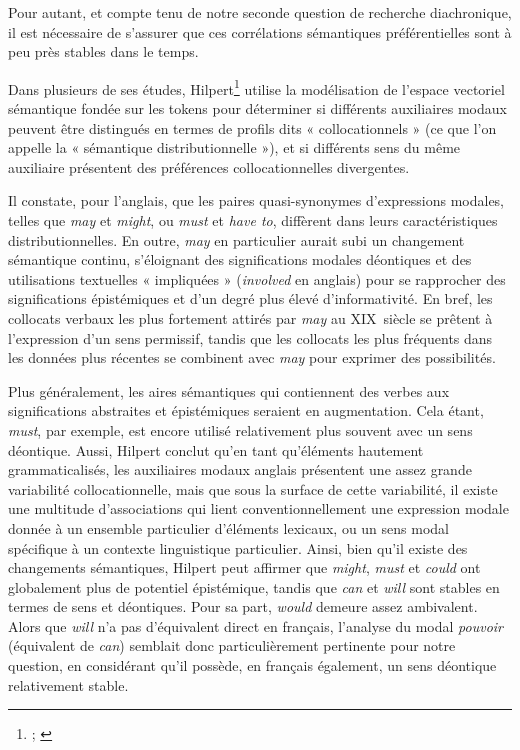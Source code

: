 Pour autant, et compte tenu de notre seconde question de recherche diachronique, il est nécessaire de s'assurer que ces corrélations sémantiques préférentielles sont à peu près stables dans le temps.

Dans plusieurs de ses études, Hilpert\footnote{\cite{hilpert_change_2016}; \cite{hilpert_disentangling_2021}} utilise la modélisation de l'espace vectoriel sémantique fondée sur les tokens pour déterminer si différents auxiliaires modaux peuvent être distingués en termes de profils dits « collocationnels » (ce que l'on appelle la « sémantique distributionnelle »), et si différents sens du même auxiliaire présentent des préférences collocationnelles divergentes.  

Il constate, pour l'anglais, que les paires quasi-synonymes d'expressions modales, telles que \textit{may} et \textit{might}, ou \textit{must} et \textit{have to}, diffèrent dans leurs caractéristiques distributionnelles. En outre, \textit{may} en particulier aurait subi un changement sémantique continu, s'éloignant des significations modales déontiques et des utilisations textuelles « impliquées » (\textit{involved} en anglais) pour se rapprocher des significations épistémiques et d'un degré plus élevé d'informativité. En bref, les collocats verbaux les plus fortement attirés par \textit{may} au XIX\ieme ~siècle se prêtent à l'expression d'un sens permissif, tandis que les collocats les plus fréquents dans les données plus récentes se combinent avec \textit{may} pour exprimer des possibilités. 

Plus généralement, les aires sémantiques qui contiennent des verbes aux significations abstraites et épistémiques seraient en augmentation. Cela étant, \textit{must}, par exemple, est encore utilisé relativement plus souvent avec un sens déontique. Aussi, Hilpert conclut qu'en tant qu'éléments hautement grammaticalisés, les auxiliaires modaux anglais présentent une assez grande variabilité collocationnelle, mais que sous la surface de cette variabilité, il existe une multitude d'associations qui lient conventionnellement une expression modale donnée à un ensemble particulier d'éléments lexicaux, ou un sens modal spécifique à un contexte linguistique particulier. Ainsi, bien qu'il existe des changements sémantiques, Hilpert peut affirmer que \textit{might}, \textit{must} et \textit{could} ont globalement plus de potentiel épistémique, tandis que \textit{can} et \textit{will} sont stables en termes de sens et déontiques. Pour sa part, \textit{would} demeure assez ambivalent. Alors que \textit{will} n'a pas d'équivalent direct en français, l'analyse du modal \textit{pouvoir} (équivalent de \textit{can}) semblait donc particulièrement pertinente pour notre question, en considérant qu’il possède, en français également, un sens déontique relativement stable.

